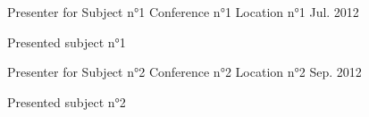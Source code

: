


\begin{cventries}


\cventry
{Presenter for Subject n°1} %
{Conference n°1} %
{Location n°1} %
{Jul. 2012} %
{ %
\begin{cvitems}
\item {Presented subject n°1}
\end{cvitems}
}


\cventry
{Presenter for Subject n°2} %
{Conference n°2} %
{Location n°2} %
{Sep. 2012} %
{ %
\begin{cvitems}
\item {Presented subject n°2}
\end{cvitems}
}


\end{cventries}